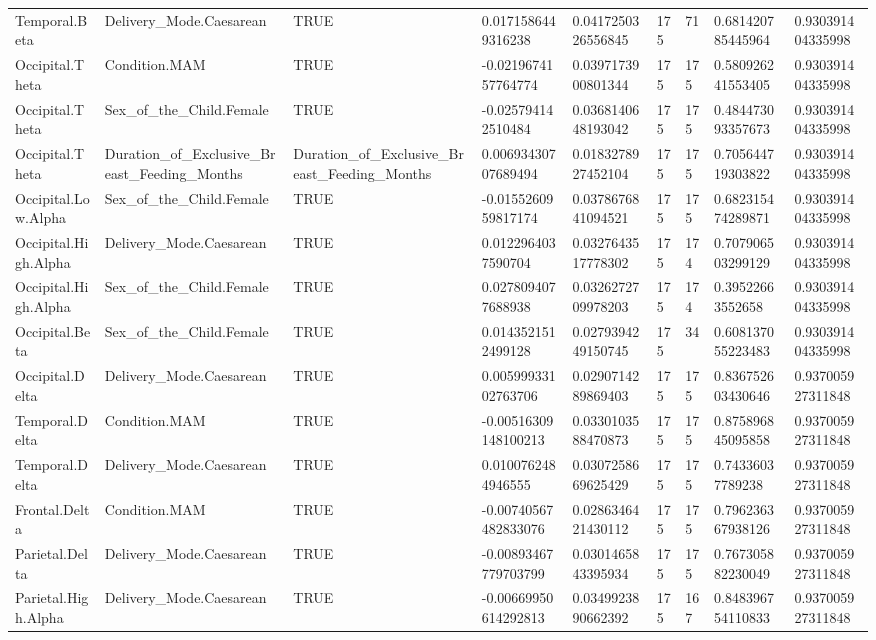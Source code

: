 \begin{longtable}{lllllllll}
Temporal.Beta & Delivery\_Mode.Caesarean & TRUE & 0.0171586449316238 & 0.0417250326556845 & 175 & 71 & 0.681420785445964 & 0.930391404335998 \\
Occipital.Theta & Condition.MAM & TRUE & -0.0219674157764774 & 0.0397173900801344 & 175 & 175 & 0.580926241553405 & 0.930391404335998 \\
Occipital.Theta & Sex\_of\_the\_Child.Female & TRUE & -0.025794142510484 & 0.0368140648193042 & 175 & 175 & 0.484473093357673 & 0.930391404335998 \\
Occipital.Theta & Duration\_of\_Exclusive\_Breast\_Feeding\_Months & Duration\_of\_Exclusive\_Breast\_Feeding\_Months & 0.00693430707689494 & 0.0183278927452104 & 175 & 175 & 0.705644719303822 & 0.930391404335998 \\
Occipital.Low.Alpha & Sex\_of\_the\_Child.Female & TRUE & -0.0155260959817174 & 0.0378676841094521 & 175 & 175 & 0.682315474289871 & 0.930391404335998 \\
Occipital.High.Alpha & Delivery\_Mode.Caesarean & TRUE & 0.0122964037590704 & 0.0327643517778302 & 175 & 174 & 0.707906503299129 & 0.930391404335998 \\
Occipital.High.Alpha & Sex\_of\_the\_Child.Female & TRUE & 0.0278094077688938 & 0.0326272709978203 & 175 & 174 & 0.39522663552658 & 0.930391404335998 \\
Occipital.Beta & Sex\_of\_the\_Child.Female & TRUE & 0.0143521512499128 & 0.0279394249150745 & 175 & 34 & 0.608137055223483 & 0.930391404335998 \\
Occipital.Delta & Delivery\_Mode.Caesarean & TRUE & 0.00599933102763706 & 0.0290714289869403 & 175 & 175 & 0.836752603430646 & 0.937005927311848 \\
Temporal.Delta & Condition.MAM & TRUE & -0.00516309148100213 & 0.0330103588470873 & 175 & 175 & 0.875896845095858 & 0.937005927311848 \\
Temporal.Delta & Delivery\_Mode.Caesarean & TRUE & 0.0100762484946555 & 0.0307258669625429 & 175 & 175 & 0.74336037789238 & 0.937005927311848 \\
Frontal.Delta & Condition.MAM & TRUE & -0.00740567482833076 & 0.0286346421430112 & 175 & 175 & 0.796236367938126 & 0.937005927311848 \\
Parietal.Delta & Delivery\_Mode.Caesarean & TRUE & -0.00893467779703799 & 0.0301465843395934 & 175 & 175 & 0.767305882230049 & 0.937005927311848 \\
Parietal.High.Alpha & Delivery\_Mode.Caesarean & TRUE & -0.00669950614292813 & 0.0349923890662392 & 175 & 167 & 0.848396754110833 & 0.937005927311848 \\

\end{longtable}
